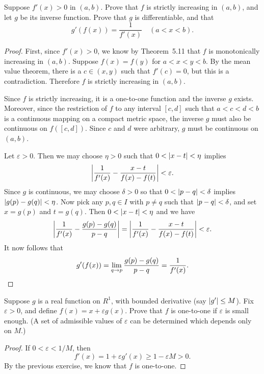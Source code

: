  Suppose $f'(x) > 0$ in $(a,b)$. Prove that $f$ is strictly
increasing in $(a,b)$, and let $g$ be its inverse function. Prove that
$g$ is differentiable, and that
\begin{equation*}
  g'(f(x))
  = \frac1{f'(x)}
  \quad
  (a < x < b).
\end{equation*}
\begin{proof}
  First, since $f'(x) > 0$, we know by Theorem~5.11 that $f$ is
  monotonically increasing in $(a,b)$. Suppose $f(x) = f(y)$ for
  $a<x<y<b$. By the mean value theorem, there is a $c\in(x,y)$ such
  that $f'(c) = 0$, but this is a contradiction. Therefore $f$ is
  strictly increasing in $(a,b)$.

  Since $f$ is strictly increasing, it is a one-to-one function and
  the inverse $g$ exists. Moreover, since the restriction of $f$ to
  any interval $[c,d]$ such that $a < c < d < b$ is a continuous
  mapping on a compact metric space, the inverse $g$ must also be
  continuous on $f([c,d])$. Since $c$ and $d$ were arbitrary, $g$ must
  be continuous on $(a,b)$.

  Let $\varepsilon > 0$. Then we may choose $\eta > 0$ such that
  $0 < \lvert{x - t}\rvert < \eta$ implies
  \begin{equation*}
    \left\lvert{\frac1{f'(x)} - \frac{x - t}{f(x) - f(t)}}\right\rvert < \varepsilon.
  \end{equation*}
  Since $g$ is continuous, we may choose $\delta > 0$ so that
  $0 < \lvert{p - q}\rvert < \delta$ implies $\lvert{g(p) - g(q)}\rvert < \eta$. Now
  pick any $p,q\in I$ with $p\neq q$ such that $\lvert{p - q}\rvert < \delta$,
  and set $x = g(p)$ and $t = g(q)$. Then $0 < \lvert{x - t}\rvert < \eta$ and
  we have
  \begin{equation*}
    \left\lvert{\frac1{f'(x)} - \frac{g(p) - g(q)}{p - q}}\right\rvert
    = \left\lvert{\frac1{f'(x)} - \frac{x - t}{f(x) - f(t)}}\right\rvert
    < \varepsilon.
  \end{equation*}
  It now follows that
  \begin{equation*}
    g'(f(x)) = \lim_{q\to p}\frac{g(p) - g(q)}{p - q}
    = \frac1{f'(x)}. \qedhere
  \end{equation*}
\end{proof}

 Suppose $g$ is a real function on $R^1$, with bounded
derivative (say $\lvert{g'}\rvert \leq M$). Fix $\varepsilon > 0$, and define
$f(x) = x + \varepsilon g(x)$. Prove that $f$ is one-to-one if
$\varepsilon$ is small enough. (A set of admissible values of
$\varepsilon$ can be determined which depends only on $M$.)
\begin{proof}
  If $0 < \varepsilon < 1/M$, then
  \begin{equation*}
    f'(x) = 1 + \varepsilon g'(x)
    \geq 1 - \varepsilon M > 0.
  \end{equation*}
  By the previous exercise, we know that $f$ is one-to-one.
\end{proof}

